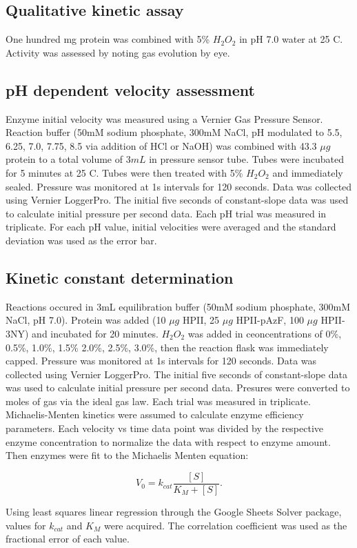 \documentclass[9pt,twocolumn,twoside]{pnas-new}
\begin{document}
{\subsection*{Qualitative kinetic assay}
One hundred mg protein was combined with 5\% $H_2O_2$ in pH 7.0 water at 25 \degree C. Activity was assessed by noting gas evolution by eye.\\

\subsection*{pH dependent velocity assessment}
Enzyme initial velocity was measured using a Vernier Gas Pressure Sensor. Reaction buffer (50mM sodium phosphate, 300mM NaCl, pH modulated to 5.5, 6.25, 7.0, 7.75, 8.5 via addition of HCl or NaOH) was combined with 43.3 $\mu g$ protein to a total volume of $3mL$ in pressure sensor tube. Tubes were incubated for 5 minutes at 25 \degree C. Tubes were then treated with 5\% $H_2O_2$ and immediately sealed. Pressure was monitored at 1s intervals for 120 seconds. Data was collected using Vernier LoggerPro. The initial five seconds of constant-slope data was used to calculate initial pressure per second data. Each pH trial was measured in triplicate. For each pH value, initial velocities were averaged and the standard deviation was used as the error bar.\\

\subsection*{Kinetic constant determination}
Reactions occured in 3mL equilibration buffer (50mM sodium phosphate, 300mM NaCl, pH 7.0). Protein was added (10 $\mu g$ HPII, 25 $\mu g$ HPII-pAzF, 100 $\mu g$ HPII-3NY) and incubated for 20 minutes. $H_2O_2$ was added in ceoncentrations of 0\%, 0.5\%, 1.0\%, 1.5\% 2.0\%, 2.5\%, 3.0\%, then the reaction flask was immediately capped. Pressure was monitored at 1s intervals for 120 seconds. Data was collected using Vernier LoggerPro. The initial five seconds of constant-slope data was used to calculate initial pressure per second data. Presures were converted to moles of gas via the ideal gas law. Each trial was measured in triplicate.\\

Michaelis-Menten kinetics were assumed to calculate enzyme efficiency parameters. Each velocity vs time data point was divided by the respective enzyme concentration to normalize the data with respect to enzyme amount. Then enzymes were fit to the Michaelis Menten equation:

\begin{equation*}
  V_0 = k_{cat} \frac{[S]}{K_M+[S]}.
\end{equation*}

Using least squares linear regression through the Google Sheets Solver package, values for $k_{cat}$ and $K_M$ were acquired. The correlation coefficient was used as the fractional error of each value.\\

}
\end{document}
